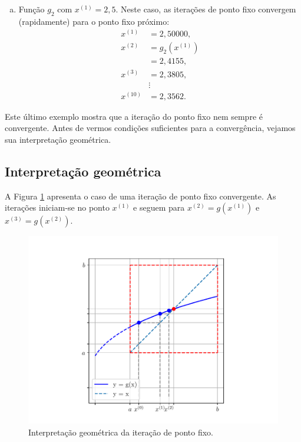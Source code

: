 \begin{ex}
\begin{enumerate}[a)]
  \item Função $g_2$ com $x^{(1)} = 2,5$.
    Neste caso, as iterações de ponto fixo convergem (rapidamente) para o ponto fixo próximo:
    \begin{align}
      x^{(1)} &= 2,50000,\\
      x^{(2)} &= g_2\left(x^{(1)}\right)\\
              &= 2,4155,\\
      x^{(3)} &= 2,3805,\\
              &\vdots \\
      x^{(10)} &= 2,3562.
    \end{align}    
  \end{enumerate}
\end{ex}

Este último exemplo mostra que a iteração do ponto fixo nem sempre é convergente. Antes de vermos condições suficientes para a convergência, vejamos sua interpretação geométrica.

\subsection{Interpretação geométrica}

A Figura \ref{cap_eq1d_sec_pfixo:fig:pfixo_interp} apresenta o caso de uma iteração de ponto fixo convergente. As iterações iniciam-se no ponto $x^{(1)}$ e seguem para $x^{(2)} = g(x^{(1)})$ e $x^{(3)} = g(x^{(2)})$.

\begin{figure}[H]
  \centering
  \includegraphics[width=\textwidth]{./cap_eq1d/dados/fig_pfixo_interp/fig}
  \caption{Interpretação geométrica da iteração de ponto fixo.}
  \label{cap_eq1d_sec_pfixo:fig:pfixo_interp}
\end{figure}

